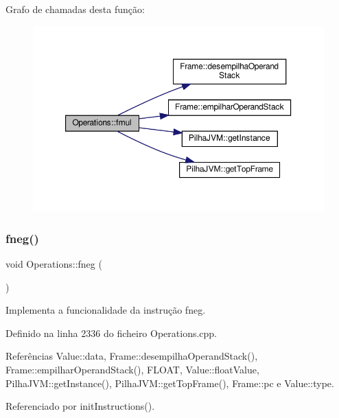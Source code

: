 Grafo de chamadas desta função\+:
\nopagebreak
\begin{figure}[H]
\begin{center}
\leavevmode
\includegraphics[width=350pt]{classOperations_ad4caf68c912edd7bfac5c8d74c1e2036_cgraph}
\end{center}
\end{figure}
\mbox{\label{classOperations_a17a7d8f333373d30ae5b1595d96594e5}} 
\subsubsection{\texorpdfstring{fneg()}{fneg()}}
{\footnotesize\ttfamily void Operations\+::fneg (\begin{DoxyParamCaption}{ }\end{DoxyParamCaption})\hspace{0.3cm}{\ttfamily [private]}}



Implementa a funcionalidade da instrução fneg. 



Definido na linha 2336 do ficheiro Operations.\+cpp.



Referências Value\+::data, Frame\+::desempilha\+Operand\+Stack(), Frame\+::empilhar\+Operand\+Stack(), F\+L\+O\+AT, Value\+::float\+Value, Pilha\+J\+V\+M\+::get\+Instance(), Pilha\+J\+V\+M\+::get\+Top\+Frame(), Frame\+::pc e Value\+::type.



Referenciado por init\+Instructions().

